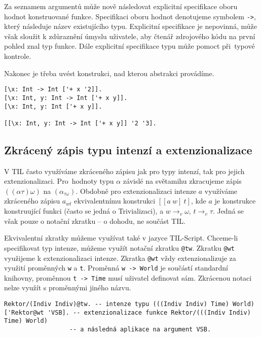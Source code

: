 Za seznamem argumentů může nově následovat explicitní specifikace oboru hodnot konstruované funkce.
Specifikaci oboru hodnot denotujeme symbolem \lstinline{->}, který následuje název existujícího
typu. Explicitní specifikace je nepovinná, může však sloužit k zdůraznění úmyslu uživatele, aby
čtenář zdrojového kódu na první pohled znal typ funkce. Dále explicitní specifikace typu může
pomoct při~typové kontrole.

Nakonec je třeba uvést konstrukci, nad kterou abstrakci provádíme.

\begin{lstlisting}[caption={Příklad využití Uzávěrů}]
[\x: Int -> Int ['+ x '2]].
[\x: Int, y: Int -> Int ['+ x y]].
[\x: Int, y: Int ['+ x y]].

[[\x: Int, y: Int -> Int ['+ x y]] '2 '3].
\end{lstlisting}

\subsection{Zkrácený zápis typu intenzí a extenzionalizace}

V TIL často využíváme zkráceného zápisu jak pro typy intenzí, tak pro jejich extenzionalizaci.
Pro~hodnoty typu $\alpha$ závislé na světamihu zkracujeme zápis $((\alpha\tau)\omega)$
na $(\alpha_{\tau\omega})$. Obdobně pro extenzionalizaci intenze $a$ využíváme zkráceného zápisu
$a_{wt}$ ekvivalentnímu konstrukci $[[a\:w]\:t]$, kde $a$ je konstrukce konstruující funkci
(často se jedná o Trivializaci), a $w \rightarrow_v \omega$, $t \rightarrow_v \tau$. Jedná
se však pouze o notační zkratku -- o dohodu, ne součást TIL.

Ekvivalentní zkratky můžeme využívat také v jazyce TIL-Script. Chceme-li specifikovat typ intenze,
můžeme využít notační zkratku \lstinline{@tw}. Zkratku \lstinline{@wt} využijeme k extenzionalizaci
intenze. Zkratka \lstinline{@wt} vždy extenzionalizuje za využití proměnných \lstinline{w} a
\lstinline{t}. Proměnná \lstinline{w -> World} je součástí standardní knihovny, proměnnou
\lstinline{t -> Time} musí uživatel definovat sám. Zkrácenou notaci nelze využít s proměnnými
jiného názvu.

\begin{lstlisting}[caption={Příklad využití zkrácené notace}]
Rektor/(Indiv Indiv)@tw. -- intenze typu (((Indiv Indiv) Time) World)
['Rektor@wt 'VSB]. -- extenzionalizace funkce Rektor/(((Indiv Indiv) Time) World)
                  -- a následná aplikace na argument VSB.
\end{lstlisting}

